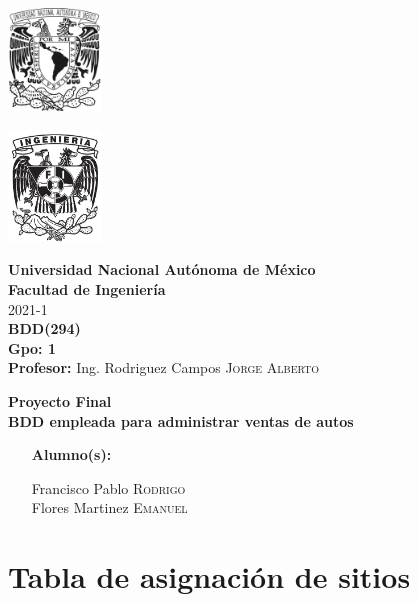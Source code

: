 \documentclass{article}
\newcommand{\coverPage}{
\thispagestyle{empty}
  \begin{minipage}[t][5cm][t]{0.2\linewidth}
    \includegraphics[width=2.5cm]{unam-negro}

    \vspace{10cm}

    \includegraphics[width=2.5cm]{fi-negro}
  \end{minipage}
  \begin{minipage}[t]{0.7\linewidth}
    \vspace{-2.5cm}
    \LARGE{\textbf{\university}}\\
    \Large{\textbf{\faculty}} \\
  
    \large{\semestre}\\[2cm]
  
    \large{\textbf{\materia (\clave)}}\\
    \large{\textbf{Gpo: \grupo}}\\[5mm]
    \large{\textbf{Profesor:} \profesor}\\ [1.5cm]
    \begin{center}
        \LARGE{\textbf{\actividad}}\\
        \LARGE{\textbf{\titulo}}\\
    \end{center}
  
    \vspace{3.3cm}
  
    \large{
      \begin{itemize}[ noitemsep, align=left ]
        \item [\textbf{Alumno(s):}] 
          \begin{flushright}
            \alumno
          \end{flushright}
      \end{itemize}
    } \vspace{1.5cm}
  
    \begin{flushright}
        \fechaEntrega%
    \end{flushright}
  \end{minipage}

\newpage
}
\begin{document}

\newcommand{\university}{Universidad Nacional Autónoma de México}
\newcommand{\faculty}{Facultad de Ingeniería}
\newcommand{\semestre}{2021-1}
\newcommand{\materia}{BDD}
\newcommand{\clave}{294}
\newcommand{\grupo}{1}
\newcommand{\profesor}{Ing. Rodriguez Campos \textsc{Jorge Alberto}}

\newcommand{\alumno}{
  Francisco Pablo \textsc{Rodrigo} \\ 
  Flores Martinez \textsc{Emanuel}   
}
\newcommand{\actividad}{Proyecto Final}
\newcommand{\titulo}{BDD empleada para administrar ventas de autos}

\newcommand{\fechaEntrega}{}

\newcommand{\codedir}{codigo}
\graphicspath{ {latex/assets/}{bdd_proyecto.assets/}{modelo} }

\coverPage%



\section*{Tabla de asignación de sitios}

\newcommand{\nameTabBuilder}[1]{F\_RFP\_#1}
\newcommand{\snI}{RFP\_S1}
\newcommand{\snII}{RFP\_S2}
\newcommand{\snIII}{EFM\_S1}
\newcommand{\snIV}{EFM\_S2}
\newcommand{\pdbI}{rfpbd\_s1.fi.unam}
\newcommand{\pdbII}{rfpbd\_s2.fi.unam}
\newcommand{\pdbIII}{efmbd\_s1.fi.unam}
\newcommand{\pdbIV}{efmbd\_s2.fi.unam}
\end{document}
